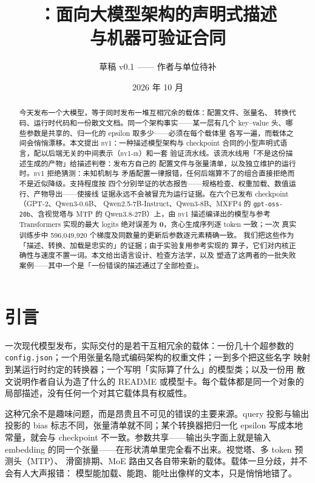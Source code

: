 \documentclass[11pt,a4paper]{ctexart}
\title{\byone{}：面向大模型架构的声明式描述\\与机器可验证合同}
\author{草稿 v0.1 —— 作者与单位待补}
\date{2026 年 10 月}
\newcommand{\code}[1]{\texttt{#1}}
\newcommand{\byone}{\textsc{by1}}
\newcommand{\ir}{\textsc{by1-ir}}
\begin{document}
\maketitle

\begin{abstract}
今天发布一个大模型，等于同时发布一堆互相冗余的载体：配置文件、张量名、
转换代码、运行时代码和一份散文文档。同一个架构事实——某一层有几个
key--value 头、哪些参数是共享的、归一化的 epsilon 取多少——必须在每个载体里
各写一遍，而载体之间会悄悄漂移。本文提出 \byone{}：一种描述模型架构与
checkpoint 合同的小型声明式语言，配以后端无关的中间表示（\ir{}）和一套
验证流水线。该流水线用「不是这份描述生成的产物」给描述判卷：发布方自己的
配置文件与张量清单，以及独立维护的运行时。\byone{} 拒绝猜测：未知机制与
矛盾配置一律报错，任何后端算不了的组合直接拒绝而不是近似降级。支持程度按
四个分别举证的状态报告——规格检查、权重加载、数值运行、产物导出——使接线
证据永远不会被冒充为运行证据。在六个已发布 checkpoint（GPT-2、Qwen3-0.6B、
Qwen2.5-7B-Instruct、Qwen3-8B、MXFP4 的 \code{gpt-oss-20b}、含视觉塔与
MTP 的 Qwen3.8-27B）上，由 \byone{} 描述编译出的模型与参考 Transformers
实现的最大 logits 绝对误差为 \textbf{0}，贪心生成序列逐 token 一致；一次
真实训练步中 596{,}049{,}920 个梯度及同数量的更新后参数逐元素精确一致。
我们把这些作为「描述、转换、加载是忠实的」的证据；由于实验复用参考实现的
算子，它们对内核正确性与速度不置一词。本文给出语言设计、检查方法学，以及
塑造了这两者的一批失败案例——其中一个是「一份错误的描述通过了全部检查」。
\end{abstract}

\section{引言}

一次现代模型发布，实际交付的是若干互相冗余的载体：一份几十个超参数的
\code{config.json}；一个用张量名隐式编码架构的权重文件；一到多个把这些名字
映射到某运行时约定的转换器；一个写明「实际算了什么」的模型类；以及一份用
散文说明作者自认为造了什么的 README 或模型卡。每个载体都是同一个对象的
局部描述，没有任何一个对其它载体具有权威性。

这种冗余不是趣味问题，而是昂贵且不可见的错误的主要来源。query 投影与输出
投影的 bias 标志不同，张量清单就不同；某个转换器把归一化 epsilon 写成本地
常量，就会与 checkpoint 不一致。参数共享——输出头字面上就是输入 embedding
的同一个张量——在形状清单里完全看不出来。视觉塔、多 token 预测头（MTP）、
滑窗排期、MoE 路由又各自带来新的载体。载体一旦分歧，并不会有人大声报错：
模型能加载、能跑、能吐出像样的文本，只是悄悄地错了。
\end{document}
